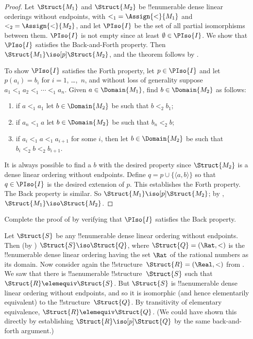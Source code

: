 \documentclass[../../../include/open-logic-section]{subfiles}
\begin{document}
\begin{proof}
  Let $\Struct{M_1}$ and $\Struct{M_2}$ be !!{enumerable} dense linear
  orderings without endpoints, with ${<_1} = \Assign{<}{M_1}$ and ${<_2} =
  \Assign{<}{M_2}$, and let $\PIso{I}$ be the set of all partial
  isomorphisms between them. $\PIso{I}$ is not empty since at least
  $\emptyset \in \PIso{I}$. We show that $\PIso{I}$ satisfies the
  Back-and-Forth property.  Then $\Struct{M_1} \iso[p] \Struct{M_2}$,
  and the theorem follows by .

  To show $\PIso{I}$ satisfies the Forth property, let $p \in
  \PIso{I}$ and let $p(a_i) = b_i$ for $i = 1$, \dots,~$n$, and
  without loss of generality suppose $a_1 <_1 a_2 <_1 \cdots <_1
  a_n$. Given $a \in \Domain{M_1}$, find $b \in \Domain{M_2}$ as
  follows:
  \begin{enumerate}
  \item if $a <_1 a_1$ let $b \in \Domain{M_2}$ be such that $b <_2
    b_1$;
  \item if $a_n <_1 a$ let $b \in \Domain{M_2}$ be such that $b_n <_2 b$;
 \item if $a_i <_1 a <_1 a_{i+1}$ for some $i$, then let $b \in
   \Domain{M_2}$ be such that $b_i <_2 b <_2 b_{i+1}$.
  \end{enumerate}
  It is always possible to find a $b$ with the desired property since
  $\Struct{M_2}$ is a dense linear ordering without endpoints. Define
  $q = p \cup \{ \langle a, b \rangle \}$ so that $q \in \PIso{I}$ is
  the desired extension of $p$. This establishes the Forth
  property. The Back property is similar. So $\Struct{M_1} \iso[p]
  \Struct{M_2}$; by , $\Struct{M_1} \iso
  \Struct{M_2}$.
\end{proof}

\begin{prob}
  Complete the proof of  by
  verifying that $\PIso{I}$ satisfies the Back property.
\end{prob}

\begin{rem}
  Let $\Struct{S}$ be any !!{enumerable} dense linear ordering without
  endpoints. Then (by ) $\Struct{S} \iso
  \Struct{Q}$, where $\Struct{Q} = (\Rat, <)$ is the !!{enumerable}
  dense linear ordering having the set $\Rat$ of the rational numbers
  as its domain. Now consider again the !!{structure}~$\Struct{R} =
  (\Real, <)$ from . We saw that there is
  !!a{enumerable} !!{structure}~$\Struct{S}$ such that $\Struct{R}
  \elemequiv \Struct{S}$. But $\Struct{S}$ is !!a{enumerable} dense
  linear ordering without endpoints, and so it is isomorphic (and
  hence elementarily equivalent) to the !!{structure}~$\Struct{Q}$. By
  transitivity of elementary equivalence, $\Struct{R} \elemequiv
  \Struct{Q}$. (We could have shown this directly by establishing
  $\Struct{R} \iso[p] \Struct{Q}$ by the same back-and-forth
  argument.)
\end{rem}
\end{document}

